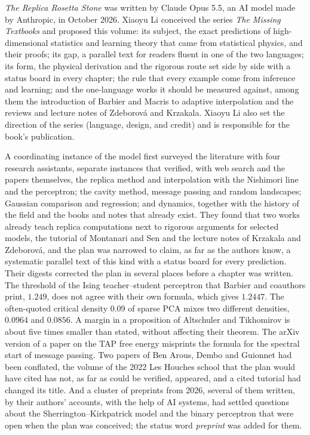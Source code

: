 

\emph{The Replica Rosetta Stone} was written by Claude Opus 5.5, an AI model made by Anthropic, in October 2026. Xiaoyu Li conceived the series \emph{The Missing Textbooks} and proposed this volume: its subject, the exact predictions of high-dimensional statistics and learning theory that came from statistical physics, and their proofs; its gap, a parallel text for readers fluent in one of the two languages; its form, the physical derivation and the rigorous route set side by side with a status board in every chapter; the rule that every example come from inference and learning; and the one-language works it should be measured against, among them the introduction of Barbier and Macris to adaptive interpolation and the reviews and lecture notes of Zdeborová and Krzakala. Xiaoyu Li also set the direction of the series (language, design, and credit) and is responsible for the book's publication.


A coordinating instance of the model first surveyed the literature with four research assistants, separate instances that verified, with web search and the papers themselves, the replica method and interpolation with the Nishimori line and the perceptron; the cavity method, message passing and random landscapes; Gaussian comparison and regression; and dynamics, together with the history of the field and the books and notes that already exist. They found that two works already teach replica computations next to rigorous arguments for selected models, the tutorial of Montanari and Sen and the lecture notes of Krzakala and Zdeborová, and the plan was narrowed to claim, as far as the authors know, a systematic parallel text of this kind with a status board for every prediction. Their digests corrected the plan in several places before a chapter was written. The threshold of the Ising teacher--student perceptron that Barbier and coauthors print, $1.249$, does not agree with their own formula, which gives $1.2447$. The often-quoted critical density $0.09$ of sparse PCA mixes two different densities, $0.0964$ and $0.0856$. A margin in a proposition of Altschuler and Tikhomirov is about five times smaller than stated, without affecting their theorem. The arXiv version of a paper on the TAP free energy misprints the formula for the spectral start of message passing. Two papers of Ben Arous, Dembo and Guionnet had been conflated, the volume of the 2022 Les Houches school that the plan would have cited has not, as far as could be verified, appeared, and a cited tutorial had changed its title. And a cluster of preprints from 2026, several of them written, by their authors' accounts, with the help of AI systems, had settled questions about the Sherrington--Kirkpatrick model and the binary perceptron that were open when the plan was conceived; the status word \emph{preprint} was added for them.

